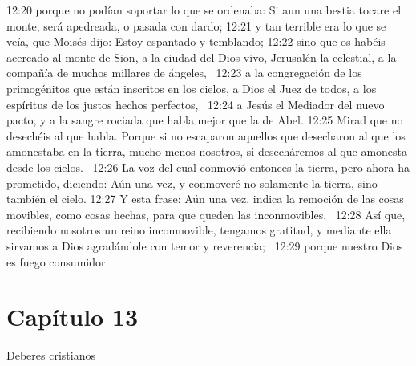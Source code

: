 12:20 porque no podían soportar lo que se ordenaba: Si aun una bestia tocare el monte, será apedreada, o pasada con dardo; 
12:21 y tan terrible era lo que se veía, que Moisés dijo: Estoy espantado y temblando; 
12:22 sino que os habéis acercado al monte de Sion, a la ciudad del Dios vivo, Jerusalén la celestial, a la compañía de muchos millares de ángeles,  
12:23 a la congregación de los primogénitos que están inscritos en los cielos, a Dios el Juez de todos, a los espíritus de los justos hechos perfectos,  
12:24 a Jesús el Mediador del nuevo pacto, y a la sangre rociada que habla mejor que la de Abel. 
12:25 Mirad que no desechéis al que habla. Porque si no escaparon aquellos que desecharon al que los amonestaba en la tierra, mucho menos nosotros, si desecháremos al que amonesta desde los cielos.  
12:26 La voz del cual conmovió entonces la tierra, pero ahora ha prometido, diciendo: Aún una vez, y conmoveré no solamente la tierra, sino también el cielo. 
12:27 Y esta frase: Aún una vez, indica la remoción de las cosas movibles, como cosas hechas, para que queden las inconmovibles.  
12:28 Así que, recibiendo nosotros un reino inconmovible, tengamos gratitud, y mediante ella sirvamos a Dios agradándole con temor y reverencia;  
12:29 porque nuestro Dios es fuego consumidor. 
\section*{Capítulo 13 }
Deberes cristianos  

